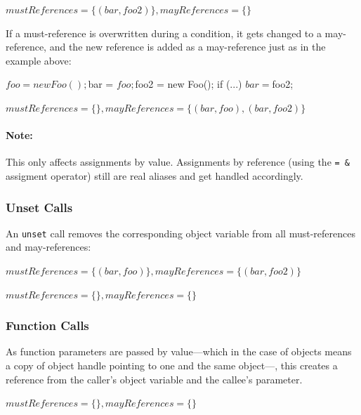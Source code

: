 $mustReferences = \{(bar, foo2)\}, mayReferences = \{\}$

If a must-reference is overwritten during a condition, it gets changed to a may-reference, and the new reference is added as a may-reference just as in the example above:

\begin{phpcode}
$foo = new Foo();
$bar = $foo;

$foo2 = new Foo();
if (...) {
  $bar = $foo2;
}
\end{phpcode}

$mustReferences = \{\}, mayReferences = \{(bar, foo), (bar, foo2)\}$

\paragraph{Note:} This only affects assignments by value. Assignments by reference (using the \texttt{=~\&} assigment operator) still are real aliases and get handled accordingly.


\subsubsection{Unset Calls}

An \texttt{unset} call removes the corresponding object variable from all must-references and may-references:

$mustReferences = \{(bar, foo)\}, mayReferences = \{(bar, foo2)\}$


$mustReferences = \{\}, mayReferences = \{\}$


\subsubsection{Function Calls}

As function parameters are passed by value---which in the case of objects means a copy of object handle pointing to one and the same object---, this creates a reference from the caller's object variable and the callee's parameter.

$mustReferences = \{\}, mayReferences = \{\}$

\begin{phpcode}
function someFunction() {
  $foo = new Foo();
  otherFunction(foo);
}

function otherFunction(Foo $foo) {
\end{phpcode}

